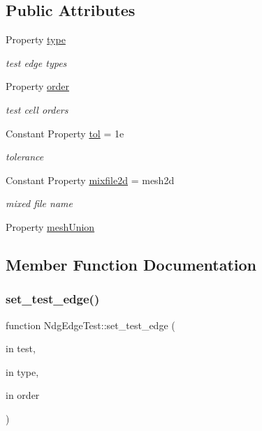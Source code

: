 \subsection*{Public Attributes}
\begin{DoxyCompactItemize}
\item 
Property \hyperlink{class_ndg_edge_test_a49d00a052d95265f17f599edb959706c}{type}
\begin{DoxyCompactList}\small\item\em test edge types \end{DoxyCompactList}\item 
Property \hyperlink{class_ndg_edge_test_ab3473b927738036503cf905cfceadf5e}{order}
\begin{DoxyCompactList}\small\item\em test cell orders \end{DoxyCompactList}\item 
Constant Property \hyperlink{class_ndg_edge_test_ae5d87d95b3963d7f9810160f7fb89cd3}{tol} = 1e
\begin{DoxyCompactList}\small\item\em tolerance \end{DoxyCompactList}\item 
Constant Property \hyperlink{class_ndg_edge_test_a44e8b8faa70b93689f4e8f0a0d80edc6}{mixfile2d} = \textquotesingle{}mesh2d
\begin{DoxyCompactList}\small\item\em mixed file name \end{DoxyCompactList}\item 
Property \hyperlink{class_ndg_edge_test_a184e51d2b7291d4a688120e8600cba02}{mesh\+Union}
\end{DoxyCompactItemize}


\subsection{Member Function Documentation}
\mbox{\label{class_ndg_edge_test_afbd964fc333e315cda741b4c79b8445a}} 
\subsubsection{\texorpdfstring{set\+\_\+test\+\_\+edge()}{set\_test\_edge()}}
{\footnotesize\ttfamily function Ndg\+Edge\+Test\+::set\+\_\+test\+\_\+edge (\begin{DoxyParamCaption}\item[{in}]{test,  }\item[{in}]{type,  }\item[{in}]{order }\end{DoxyParamCaption})}



